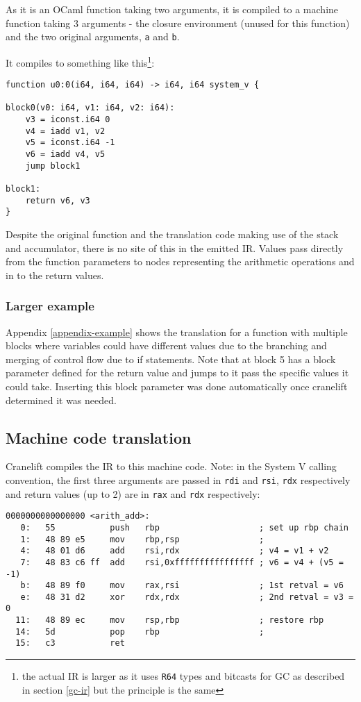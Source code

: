 As it is an OCaml function taking two arguments, it is compiled to a machine function taking 3
arguments - the closure environment (unused for this function) and the two original arguments,
\texttt{a} and \texttt{b}.

It compiles to something like this\footnote{the actual IR is larger as it uses \texttt{R64} types
      and bitcasts for GC as
      described in section \ref{gc-ir} but the principle is the same}:

\begin{verbatim}
function u0:0(i64, i64, i64) -> i64, i64 system_v {

block0(v0: i64, v1: i64, v2: i64):
    v3 = iconst.i64 0
    v4 = iadd v1, v2
    v5 = iconst.i64 -1
    v6 = iadd v4, v5
    jump block1

block1:
    return v6, v3
}
\end{verbatim}

Despite the original function and the translation code making use of the stack and accumulator,
there is no site of this in the emitted IR. Values pass directly from the function parameters to
nodes representing the arithmetic operations and in to the return values.

\subsubsection{Larger example}

Appendix \ref{appendix-example} shows the translation for a function with multiple blocks where
variables could have different values due to the branching and merging of control flow due to if
statements. Note that at block 5 has a block parameter defined for the return value and jumps to it
pass the specific values it could take. Inserting this block parameter was done automatically once
cranelift determined it was needed.

\subsection{Machine code translation}

Cranelift compiles the IR to this machine code. Note: in the System V calling convention, the first
three arguments are passed in \texttt{rdi} and \texttt{rsi}, \texttt{rdx} respectively and return
values (up to 2) are in \texttt{rax} and \texttt{rdx} respectively:

\begin{verbatim}
0000000000000000 <arith_add>:
   0:	55           push   rbp                    ; set up rbp chain
   1:	48 89 e5     mov    rbp,rsp                ;  
   4:	48 01 d6     add    rsi,rdx                ; v4 = v1 + v2
   7:	48 83 c6 ff  add    rsi,0xffffffffffffffff ; v6 = v4 + (v5 = -1)
   b:	48 89 f0     mov    rax,rsi                ; 1st retval = v6
   e:	48 31 d2     xor    rdx,rdx                ; 2nd retval = v3 = 0
  11:	48 89 ec     mov    rsp,rbp                ; restore rbp
  14:	5d           pop    rbp                    ;
  15:	c3           ret    
\end{verbatim}


